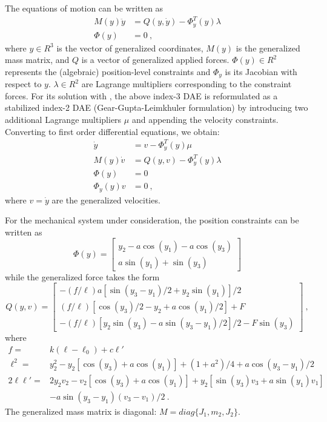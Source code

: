 The equations of motion can be written as
\begin{equation*}
  \begin{split}
    M(y) \ddot y &= Q(y,\dot y) - \Phi_y^T(y) \lambda \\
    \Phi(y)     &= 0 ~,
  \end{split}
\end{equation*}
where $y \in R^3$ is the vector of generalized coordinates, $M(y)$ is the generalized mass
matrix, and $Q$ is a vector of generalized applied forces. $\Phi(y) \in R^2$ represents the
(algebraic) position-level constraints and $\Phi_y$ is its Jacobian with respect to $y$.
$\lambda \in R^2$ are Lagrange multipliers corresponding to the constraint forces.
For its solution with {\idas}, the above index-3 DAE is reformulated as a stabilized 
index-2 DAE (Gear-Gupta-Leimkhuler formulation) by introducing two additional Lagrange 
multipliers $\mu$ and appending the velocity constraints.
Converting to first order differential equations, we obtain:
\begin{equation}\label{e:GGLform}
\begin{split}
  \dot y &= v - \Phi_y^T(y) \mu  \\
  M(y) \dot v &= Q(y,v) - \Phi_y^T(y) \lambda \\
  \Phi(y)     &= 0 \\
  \Phi_y(y) v &= 0 ~,
\end{split}
\end{equation}
where $v = \dot y$ are the generalized velocities.

For the mechanical system under consideration, the position constraints can be written as
\begin{equation*}
  \Phi(y) = \begin{bmatrix}
    y_2 - a \cos(y_1) - a \cos(y_3) \\
    a \sin(y_1) + \sin(y_3)
  \end{bmatrix}
\end{equation*}
while the generalized force takes the form
\begin{equation*}
  Q(y, v) = \begin{bmatrix}
    - (f/\ell) a [\sin(y_3-y_1)/2 + y_2 \sin(y_1)]/2 \\
    (f/\ell) [\cos(y_3)/2 - y_2 + a \cos(y_1)/2 ] + F \\
    - (f/\ell) [ y_2 \sin(y_3) - a \sin(y_3-y_1)/2]/2 - F \sin(y_3)
  \end{bmatrix} ~,
\end{equation*}
where
\begin{equation*}
  \begin{split}
    f = & k (\ell - \ell_0) + c {\ell}' \\
    \ell^2 = & y_2^2 - y_2 [\cos(y_3) + a \cos(y_1)] + (1 + a^2)/4 + a \cos(y_3-y_1)/2 \\
    2 \ell {\ell}' = & 2 y_2 v_2 - v_2 [\cos(y_3) + a \cos(y_1)] + y_2 [\sin(y_3)v_3 + a\sin(y_1)v_1] \\
    & - a \sin(y_3-y_1) (v_3-v_1)/2 ~.
  \end{split}
\end{equation*}
The generalized mass matrix is diagonal: $M = diag \{J_1, m_2, J_2\}$.

